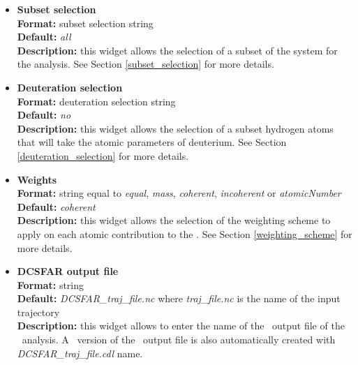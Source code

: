 \documentclass[a4paper,11pt]{report}
\begin{document}
\begin{itemize}
\hypertarget{dcsfar_subset_selection}{}
\item \textbf{Subset selection}\\
\textbf{Format:} subset selection string\\
\textbf{Default:} \textit{all}\\
\textbf{Description:} this widget allows the selection of a subset of the system for the analysis. 
See Section \ref{subset_selection} for more details.

\hypertarget{dcsfar_deuteration_selection}{}
\item \textbf{Deuteration selection}\\
\textbf{Format:} deuteration selection string\\
\textbf{Default:} \textit{no}\\
\textbf{Description:} this widget allows the selection of a subset hydrogen atoms that will take the atomic parameters 
of deuterium. See Section \ref{deuteration_selection} for more details.

\hypertarget{dcsfar_weights}{}
\item \textbf{Weights}\\
\textbf{Format:} string equal to \textit{equal}, \textit{mass}, \textit{coherent}, \textit{incoherent} or \textit{atomicNumber}\\
\textbf{Default:} \textit{coherent}\\
\textbf{Description:} this widget allows the selection of the weighting scheme to apply on each atomic contribution 
to the \DCSFAR . See Section \ref{weighting_scheme} for more details. 

\hypertarget{dcsfar_dcsfar_output_file}{}
\item \textbf{DCSFAR output file}\\
\textbf{Format:} string\\
\textbf{Default:} \textit{DCSFAR\_traj\_file.nc} where \textit{traj\_file.nc} is the name of the input trajectory\\
\textbf{Description:} this widget allows to enter the name of the \NetCDF\ output file of the \DCSFAR\ analysis. A \CDL\ 
version of the \NetCDF\ output file is also automatically created with \textit{DCSFAR\_traj\_file.cdl} name.
\end{itemize}
\end{document}
